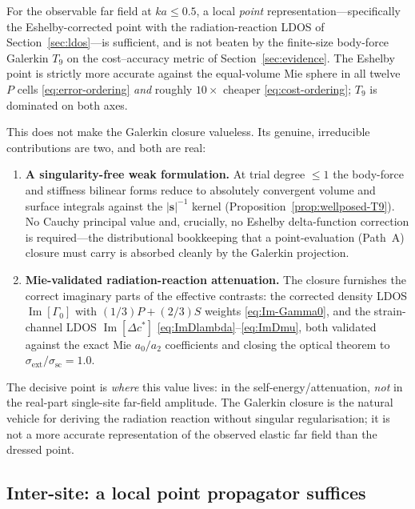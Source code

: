 \documentclass[11pt,a4paper]{article}
\newcommand{\D}{\Delta}
\newcommand{\bs}{\bm{s}}
\theoremstyle{plain}
\theoremstyle{definition}
\theoremstyle{remark}
\begin{document}
For the observable far field at $ka \le 0.5$, a local \emph{point}
representation---specifically the Eshelby-corrected point with the
radiation-reaction LDOS of Section~\ref{sec:ldos}---is sufficient, and is not
beaten by the finite-size body-force Galerkin $T_9$ on the cost--accuracy
metric of Section~\ref{sec:evidence}.  The Eshelby point is strictly more
accurate against the equal-volume Mie sphere in all twelve $P$ cells
\eqref{eq:error-ordering} \emph{and} roughly $10\times$ cheaper
\eqref{eq:cost-ordering}; $T_9$ is dominated on both axes.

This does not make the Galerkin closure valueless.  Its genuine, irreducible
contributions are two, and both are real:
\begin{enumerate}[leftmargin=2em]
  \item \textbf{A singularity-free weak formulation.}  At trial degree
    $\le 1$ the body-force and stiffness bilinear forms reduce to absolutely
    convergent volume and surface integrals against the $|\bs|^{-1}$ kernel
    (Proposition~\ref{prop:wellposed-T9}).  No Cauchy principal value and,
    crucially, no Eshelby delta-function correction is required---the
    distributional bookkeeping that a point-evaluation (Path~A) closure must
    carry is absorbed cleanly by the Galerkin projection.
  \item \textbf{Mie-validated radiation-reaction attenuation.}  The closure
    furnishes the correct imaginary parts of the effective contrasts: the
    corrected density LDOS $\operatorname{Im}[\Gamma_0]$ with $(1/3)P+(2/3)S$
    weights \eqref{eq:Im-Gamma0}, and the strain-channel LDOS
    $\operatorname{Im}[\D c^*]$ \eqref{eq:ImDlambda}--\eqref{eq:ImDmu}, both
    validated against the exact Mie $a_0/a_2$ coefficients and closing the
    optical theorem to $\sigma_\mathrm{ext}/\sigma_\mathrm{sc} = 1.0$.
\end{enumerate}
The decisive point is \emph{where} this value lives: in the
self-energy/attenuation, \emph{not} in the real-part single-site far-field
amplitude.  The Galerkin closure is the natural vehicle for deriving the
radiation reaction without singular regularisation; it is not a more accurate
representation of the observed elastic far field than the dressed point.

\subsection{Inter-site: a local point propagator suffices}
\label{sec:conclusion-inter}
\end{document}
